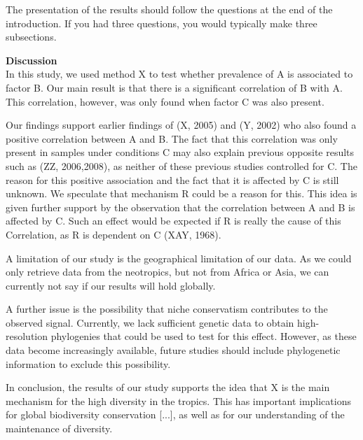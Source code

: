 \documentclass{tufte-book}
\begin{document}
The presentation of the results should follow the questions at the end of the introduction. If you had three questions, you would typically make three subsections.

\noindent\textbf{Discussion}\\
In this study, we used method X to test whether prevalence of A is associated to factor B. Our main result is that there is a significant correlation of B with A. This correlation, however, was only found when factor C was also present.

Our findings support earlier findings of (X, 2005) and (Y, 2002) who also found a positive correlation between A and B. The fact that this correlation was only present in samples under conditions C may also explain previous opposite results such as (ZZ, 2006,2008), as neither of these previous studies controlled for C. The reason for this positive association and the fact that it is affected by C is still unknown. We speculate that mechanism R could be a reason for this. This idea is given further support by the observation that the correlation between A and B is affected by C. Such an effect would be expected if R is really the cause of this Correlation, as R is dependent on C (XAY, 1968).

A limitation of our study is the geographical limitation of our data. As we could only retrieve data from the neotropics, but not from Africa or Asia, we can currently not say if our results will hold globally.

A further issue is the possibility that niche conservatism contributes to the observed signal. Currently, we lack sufficient genetic data to obtain high-resolution phylogenies that could be used to test for this effect. However, as these data become increasingly available, future studies should include phylogenetic information to exclude this possibility. 

In conclusion, the results of our study supports the idea that X is the main mechanism for the high diversity in the tropics. This has important implications for global biodiversity conservation [...], as well as for our understanding of the maintenance of diversity.
\end{document}
